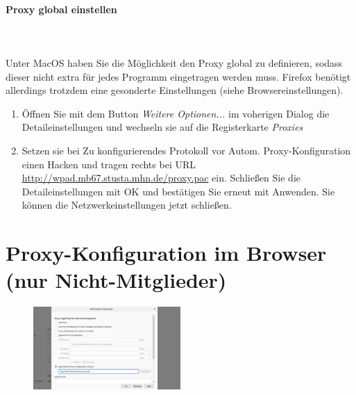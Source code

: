 \documentclass[a4paper,12pt]{scrartcl}
\begin{document}
\paragraph*{Proxy global einstellen}~\\
\\
Unter MacOS haben Sie die Möglichkeit den Proxy global zu definieren, sodass dieser nicht extra für jedes Programm eingetragen werden muss. Firefox benötigt allerdings trotzdem eine gesonderte Einstellungen (siehe Browsereinstellungen). %

\begin{enumerate}%
    \item Öffnen Sie mit dem Button \emph{Weitere Optionen...} im voherigen Dialog die Detaileinstellungen und wechseln sie auf die Registerkarte \emph{Proxies}
    \item Setzen sie bei Zu konfigurierendes Protokoll vor Autom. Proxy-Konfiguration einen Hacken und tragen rechts bei URL \url{http://wpad.mb67.stusta.mhn.de/proxy.pac} ein. Schließen Sie die Detaileinstellungen mit OK und bestätigen Sie erneut mit Anwenden. Sie können die Netzwerkeinstellungen jetzt schließen.
\end{enumerate}

\newpage

\section*{Proxy-Konfiguration im Browser (nur Nicht-Mitglieder)}
\label{Proxy}

\begin{figure}
	\vspace{-40pt}
	\begin{center}
		\includegraphics[width=0.5\textwidth,keepaspectratio]{Bilder/Firefox_proxy_mb_neu}
	\end{center}
\end{figure}
\end{document}

